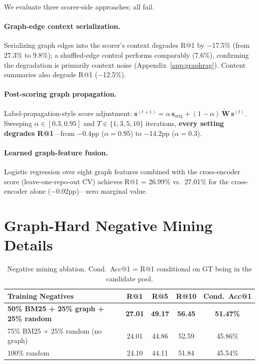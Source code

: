 \documentclass{article}
\begin{document}
We evaluate three scorer-side approaches; all fail.

\paragraph{Graph-edge context serialization.}
Serializing graph edges into the scorer's context degrades R@1 by $-$17.5\% (from 27.3\% to 9.8\%); a shuffled-edge control performs comparably (7.6\%), confirming the degradation is primarily context noise (Appendix~\ref{app:graphrag}).
Content summaries also degrade R@1 ($-$12.5\%).

\paragraph{Post-scoring graph propagation.}
Label-propagation-style score adjustment: $\mathbf{s}^{(t+1)} = \alpha \, \mathbf{s}_{\text{orig}} + (1 - \alpha) \, \widetilde{\mathbf{W}} \, \mathbf{s}^{(t)}$.
Sweeping $\alpha \in [0.3, 0.95]$ and $T \in \{1, 3, 5, 10\}$ iterations, \textbf{every setting degrades R@1}---from $-$0.4pp ($\alpha = 0.95$) to $-$14.2pp ($\alpha = 0.3$).

\paragraph{Learned graph-feature fusion.}
Logistic regression over eight graph features combined with the cross-encoder score (leave-one-repo-out CV) achieves R@1 = 26.99\% vs.\ 27.01\% for the cross-encoder alone ($-$0.02pp)---zero marginal value.

\section{Graph-Hard Negative Mining Details}
\label{app:neg_detail}

\begin{table}[h]
\centering
\caption{Negative mining ablation. Cond.\ Acc@1 = R@1 conditional on GT being in the candidate pool.}
\label{tab:negatives}
\small
\begin{tabular}{lcccc}
\toprule
\textbf{Training Negatives} & \textbf{R@1} & \textbf{R@5} & \textbf{R@10} & \textbf{Cond.\ Acc@1} \\
\midrule
\textbf{50\% BM25 + 25\% graph + 25\% random} & \textbf{27.01} & \textbf{49.17} & \textbf{56.45} & \textbf{51.47\%} \\
75\% BM25 + 25\% random (no graph) & 24.01 & 44.86 & 52.59 & 45.86\% \\
100\% random & 24.10 & 44.11 & 51.84 & 45.54\% \\
\bottomrule
\end{tabular}
\end{table}
\end{document}
